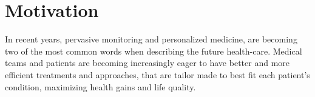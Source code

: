 %
%
%
%
%
%

\section{Motivation}
\label{section:motivation}

In recent years, pervasive monitoring and personalized medicine, are becoming two of the most common words when describing the future health-care. Medical teams and patients are becoming increasingly eager to have better and more efficient treatments and approaches, that are tailor made to best fit each patient's condition, maximizing health gains and life quality.

